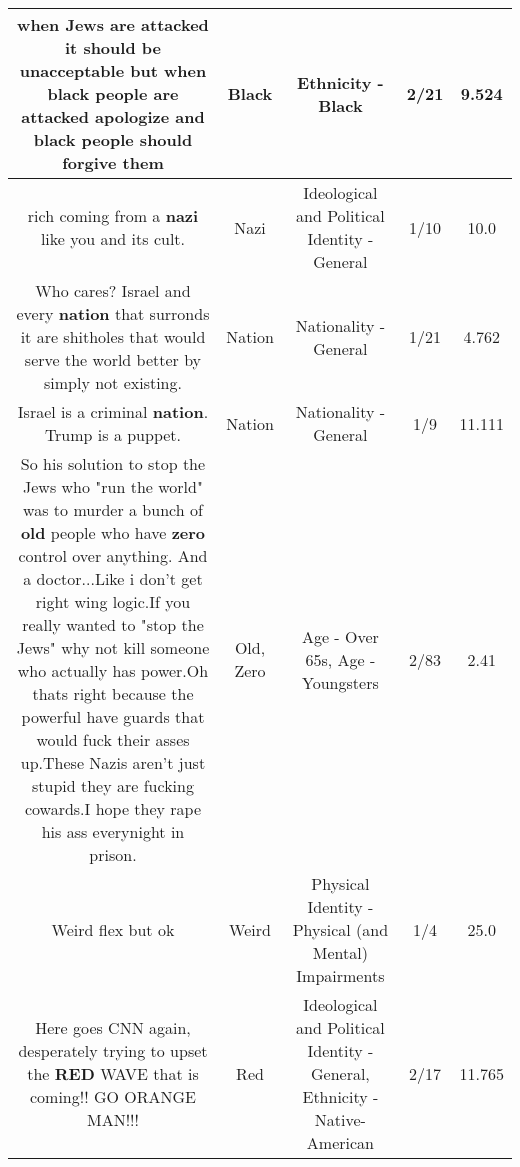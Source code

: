 \documentclass[11pt]{article}
\newlength\mylength
\begin{document}
\begin{center}
\begin{longtable}{|C{.65\mylength}|C{.30\mylength}|C{.12\mylength}|C{.12\mylength}|C{.12\mylength}|}
  \small when Jews are attacked it should be unacceptable but when \textbf{black} people are attacked apologize and \textbf{black} people should forgive them\normalsize   & Black & Ethnicity - Black & 2/21 & 9.524 \\  \hline
  \small rich coming from a \textbf{nazi} like you and its cult.\normalsize   & Nazi &  Ideological and Political Identity - General & 1/10 & 10.0 \\  \hline
  \small Who cares? Israel and every \textbf{nation} that surronds it are shitholes that would serve the world better by simply not existing.\normalsize   & Nation & Nationality - General & 1/21 & 4.762 \\  \hline
  \small Israel is a criminal \textbf{nation}. Trump is a puppet.\normalsize   & Nation & Nationality - General & 1/9 & 11.111 \\  \hline
  \small So his solution to stop the Jews who "run the world" was to murder a bunch of \textbf{old} people who have \textbf{zero} control over anything. And a doctor...Like i don't get right wing logic.If you really wanted to "stop the Jews" why not kill someone who actually has power.Oh thats right because the powerful have guards that would fuck their asses up.These Nazis aren't just stupid they are fucking cowards.I hope they rape his ass everynight in prison.\normalsize   & Old, Zero & Age - Over 65s, Age - Youngsters & 2/83 & 2.41 \\  \hline
  \small Weird flex but ok\normalsize   & Weird & Physical Identity - Physical (and Mental) Impairments & 1/4 & 25.0 \\  \hline
  \small Here goes CNN again, desperately trying to upset the \textbf{R\textbf{ED}} WAVE that is coming!!  GO ORANGE MAN!!!\normalsize   & Red &  Ideological and Political Identity - General, Ethnicity - Native-American & 2/17 & 11.765 \\  \hline

\end{longtable}
\end{center}
\end{document}
